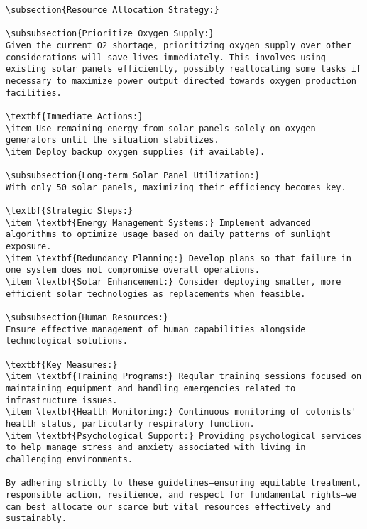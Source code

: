 \documentclass[11pt,a4paper]{article}
\begin{document}
\begin{verbatim}
\subsection{Resource Allocation Strategy:}

\subsubsection{Prioritize Oxygen Supply:}
Given the current O2 shortage, prioritizing oxygen supply over other considerations will save lives immediately. This involves using existing solar panels efficiently, possibly reallocating some tasks if necessary to maximize power output directed towards oxygen production facilities.

\textbf{Immediate Actions:}
\item Use remaining energy from solar panels solely on oxygen generators until the situation stabilizes.
\item Deploy backup oxygen supplies (if available).

\subsubsection{Long-term Solar Panel Utilization:}
With only 50 solar panels, maximizing their efficiency becomes key.

\textbf{Strategic Steps:}
\item \textbf{Energy Management Systems:} Implement advanced algorithms to optimize usage based on daily patterns of sunlight exposure.
\item \textbf{Redundancy Planning:} Develop plans so that failure in one system does not compromise overall operations.
\item \textbf{Solar Enhancement:} Consider deploying smaller, more efficient solar technologies as replacements when feasible.

\subsubsection{Human Resources:}
Ensure effective management of human capabilities alongside technological solutions.

\textbf{Key Measures:}
\item \textbf{Training Programs:} Regular training sessions focused on maintaining equipment and handling emergencies related to infrastructure issues.
\item \textbf{Health Monitoring:} Continuous monitoring of colonists' health status, particularly respiratory function.
\item \textbf{Psychological Support:} Providing psychological services to help manage stress and anxiety associated with living in challenging environments.

By adhering strictly to these guidelines—ensuring equitable treatment, responsible action, resilience, and respect for fundamental rights—we can best allocate our scarce but vital resources effectively and sustainably.
\end{verbatim}
\end{document}
